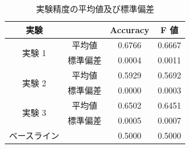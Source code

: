 \documentclass[twocolumn]{jarticle}     %
\begin{document}
\begin{table}[ht] %
	\begin{center}
		\caption{実験精度の平均値及び標準偏差}
		\label{result123}
		\begin{tabular}{|c|c|c|c|}
			\hline
			実験 &&Accuracy& F 値\\ \hline \hline
			\multirow{2}{*}{実験 1} &平均値 & 0.6766 & 0.6667  \\
			&標準偏差 & 0.0004 & 0.0011  \\ \hline
			\multirow{2}{*}{実験 2} & 平均値 & 0.5929 & 0.5692 \\
			&標準偏差 & 0.0000 & 0.0003  \\ \hline
			\multirow{2}{*}{実験 3} & 平均値 & 0.6502 & 0.6451\\
			&標準偏差 & 0.0005 & 0.0007  \\ \hline
      \multirow{1}{*}{ベースライン} & & 0.5000 & 0.5000\\ \hline
		\end{tabular}
	\end{center}
\end{table}
\end{document}
